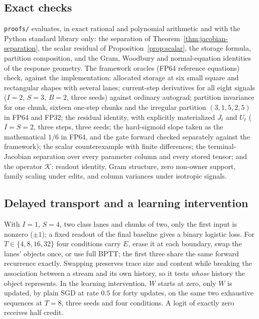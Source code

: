 \documentclass[11pt]{article}
\theoremstyle{definition}
\begin{document}
\subsection{Exact checks}

\texttt{proofs/} evaluates, in exact rational and polynomial arithmetic and with
the Python standard library only: the separation of
Theorem~\ref{thm:jacobian-separation}, the scalar residual of
Proposition~\ref{prop:scalar}, the storage formula, partition composition, and the
Gram, Woodbury and normal-equation identities of the response geometry. The
framework oracles (FP64 reference equations) check, against the implementation:
allocated storage at six small square and rectangular shapes with several lanes;
current-step derivatives for all eight signals ($I=2$, $S=3$, $B=2$, three seeds)
against ordinary autograd; partition invariance for one chunk, sixteen one-step
chunks and the irregular partition $(3,1,5,2,5)$ in FP64 and FP32; the residual
identity, with explicitly materialized $J_t$ and $U_t$ ($I=S=2$, three steps,
three seeds; the hard-sigmoid slope taken as the mathematical $1/6$ in FP64, and
the gate forward checked separately against the framework); the scalar
counterexample with finite differences; the terminal-Jacobian separation over every
parameter column and every stored tensor; and the operator $\mathcal K$: readout
identity, Gram structure, zero non-owner support, family scaling under edits, and
column variances under isotropic signals.

\subsection{Delayed transport and a learning intervention}

With $I=1$, $S=4$, two class lanes and chunks of two, only the first input is
nonzero ($\pm1$); a fixed readout of the final baseline gives a binary logistic
loss. For $T\in\{4,8,16,32\}$ four conditions carry $E$, erase it at each
boundary, swap the lanes' objects once, or use full BPTT; the first three share
the same forward recurrence exactly. Swapping preserves trace size and content
while breaking the association between a stream and its own history, so it tests
\emph{whose} history the object represents. In the learning intervention, $W$ starts
at zero, only $W$ is updated, by plain SGD at rate $0.5$ for forty updates, on the
same two exhaustive sequences at $T=8$, three seeds and four conditions. A logit of
exactly zero receives half credit.
\end{document}
